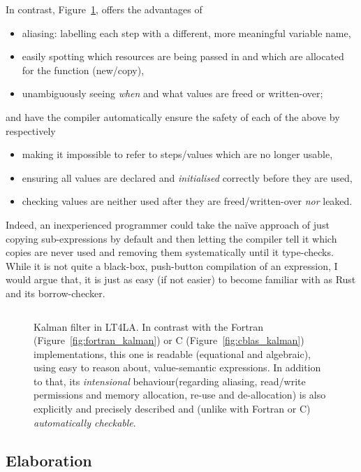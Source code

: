 In contrast, Figure~\ref{fig:ltfla_kalman}, offers the advantages of
\begin{itemize}
    \item aliasing: labelling each step with a different, more meaningful variable name,
    \item easily spotting which resources are being passed in and which are
        allocated for the function (new/copy),
    \item unambiguously seeing \emph{when} and what values are freed or written-over;
\end{itemize}
and have the compiler automatically ensure the safety of each of the above by respectively
\begin{itemize}
    \item making it impossible to refer to steps/values which are no longer usable,
    \item ensuring all values are declared and \emph{initialised} correctly before they are used,
    \item checking values are neither used after they are freed/written-over \emph{nor} leaked.
\end{itemize}

Indeed, an inexperienced programmer could take the  na\"ive approach of just
copying sub-expressions by default and then letting the compiler tell it which
copies are never used and removing them systematically until it type-checks.
While it is not quite a black-box, push-button compilation of an expression, I
would argue that, it is just as easy (if not easier) to become familiar with as
Rust and its borrow-checker.

\begin{figure}[tp]
    \inputminted[linenos, fontsize=\small]{ocaml}{../test/examples/kalman.lt}
    \caption{Kalman filter in LT4LA. In contrast with the Fortran
        (Figure~\ref{fig:fortran_kalman}) or C (Figure~\ref{fig:cblas_kalman})
        implementations, this one is readable (equational and algebraic),
        using easy to reason about, value-semantic expressions. In addition to
        that, its \emph{intensional} behaviour(regarding aliasing, read/write
        permissions and memory allocation, re-use and de-allocation) is also
        explicitly and precisely described and (unlike with Fortran or C)
        \emph{automatically checkable}.}\label{fig:ltfla_kalman}
\end{figure}

\subsection{Elaboration}


